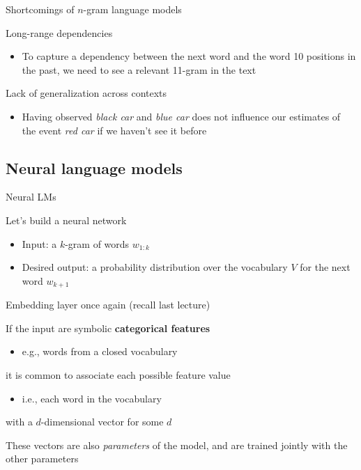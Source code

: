 \documentclass[12pt,aspectratio=169,handout]{beamer}
\begin{document}
\begin{frame}{Shortcomings of $n$-gram language models}
	
	\pause
	Long-range dependencies
	\begin{itemize}
		\item To capture a dependency between the next word and the word 10 positions in the past, we need to see a relevant 11-gram in the text
	\end{itemize}
	
	\pause
	Lack of generalization across contexts
	\begin{itemize}
		\item Having observed \emph{black car} and \emph{blue car} does not influence our estimates of the event \emph{red car} if we haven't see it before
	\end{itemize}
	


\end{frame}

\subsection{Neural language models}

\begin{frame}{Neural LMs}
	
	Let's build a neural network
	\begin{itemize}
		\item Input: a $k$-gram of words $w_{1:k}$
		\item Desired output: a probability distribution over the vocabulary $V$ for the next word $w_{k+1}$
	\end{itemize}
	
\end{frame}

\begin{frame}{Embedding layer once again (recall last lecture)}
	
	If the input are symbolic \textbf{categorical features}
	\begin{itemize}
		\item e.g., words from a closed vocabulary
	\end{itemize}
	it is common to associate each possible feature value
	\begin{itemize}
		\item i.e., each word in the vocabulary
	\end{itemize}
	with a $d$-dimensional vector for some $d$
	
	\bigskip
	
	These vectors are also \emph{parameters} of the model, and are trained jointly with the other parameters
	
\end{frame}
\end{document}
